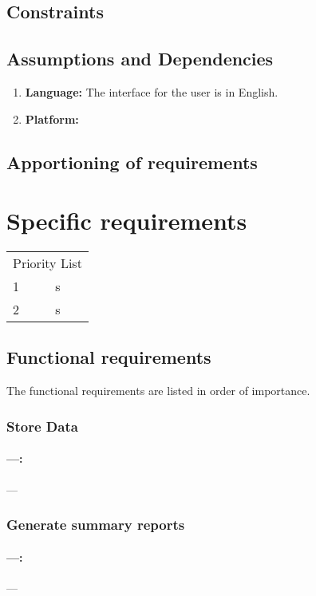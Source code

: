 \documentclass[12pt,a4paper]{article}
\begin{document}
\subsection{Constraints}

\subsection{Assumptions and Dependencies}
\begin{enumerate}
\item \textbf{Language:} The interface for the user is in English.
\item \textbf{Platform:} 
\end{enumerate}

\subsection{Apportioning of requirements}

\section{Specific requirements}
\begin{tabular}{ll}
\multicolumn{2}{c}{Priority List}\\
1&s\\
2&s\\
\end{tabular}
\subsection{Functional requirements}
The functional requirements are listed in order of importance.
\subsubsection{Store Data}
\paragraph{---:} ---

\subsubsection{Generate summary reports}
\paragraph{---:} ---
\end{document}
